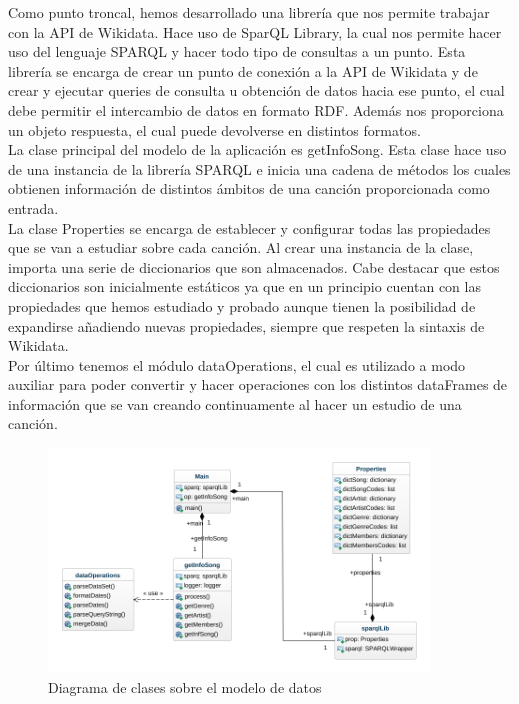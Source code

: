 Como punto troncal, hemos desarrollado una librería que nos permite trabajar con la API de Wikidata. Hace uso de SparQL Library, la cual nos permite hacer uso del lenguaje SPARQL y hacer todo tipo de consultas a un punto. Esta librería se encarga de crear un punto de conexión a la API de Wikidata y de crear y ejecutar queries de consulta u obtención de datos hacia ese punto, el cual debe permitir el intercambio de datos en formato RDF. Además nos proporciona un objeto respuesta, el cual puede devolverse en distintos formatos.\\

La clase principal del modelo de la aplicación es getInfoSong. Esta clase hace uso de una instancia de la librería SPARQL e inicia una cadena de métodos los cuales obtienen información de distintos ámbitos de una canción proporcionada como entrada.\\

La clase Properties se encarga de establecer y configurar todas las propiedades que se van a estudiar sobre cada canción. Al crear una instancia de la clase, importa una serie de diccionarios que son almacenados. Cabe destacar que estos diccionarios son inicialmente estáticos ya que en un principio cuentan con las propiedades que hemos estudiado y probado aunque tienen la posibilidad de expandirse añadiendo nuevas propiedades, siempre que respeten la sintaxis de Wikidata. \\

Por último tenemos el módulo dataOperations, el cual es utilizado a modo auxiliar para poder convertir y hacer operaciones con los distintos dataFrames de información que se van creando continuamente al hacer un estudio de una canción.\\


\begin{figure}[h!]
	\centering
	\includegraphics[width = 0.9\textwidth]{Imagenes/Bitmap/class-diagram.png}
	\caption{Diagrama de clases sobre el modelo de datos}
	\label{fig:sampleImage}
\end{figure}


